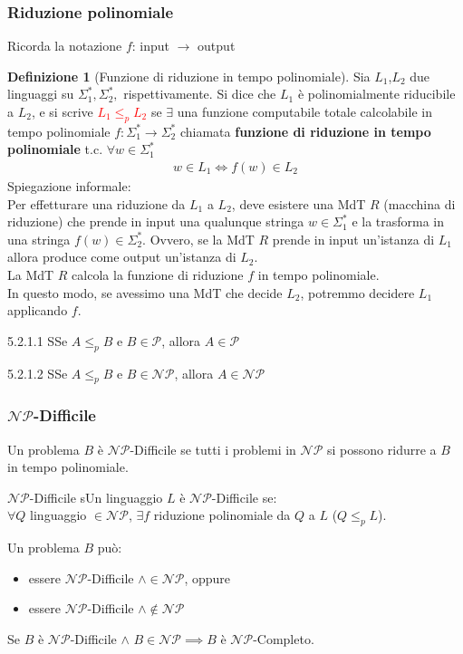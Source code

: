 \documentclass{article}  %
\theoremstyle{definition}
\newtheorem{definition}{Definizione}[section]
\begin{document}
\subsubsection{Riduzione polinomiale}
Ricorda la notazione $f$: input $\rightarrow$ output
\begin{definition}[Funzione di riduzione in tempo polinomiale]
	Sia $L_1$,$L_2$ due linguaggi su $\Sigma_{1}^*,\Sigma_{2}^*,$ rispettivamente.
	Si dice che $L_1$ è polinomialmente riducibile a $L_2$, e si scrive \textcolor{red}{$L_1 \leq_{p} L_2$} se $\exists$ una funzione computabile totale calcolabile in tempo polinomiale
	$f:\Sigma^*_1 \rightarrow \Sigma^*_2$ chiamata \textbf{funzione di riduzione in tempo polinomiale} t.c. $\forall{w}\in \Sigma^*_1$
	\begin{align*}
		w \in L_1 \iff f(w) \in L_2
	\end{align*}
	Spiegazione informale:\\
	Per effetturare una riduzione da $L_1$ a $L_2$, deve esistere una MdT $R$ (macchina di riduzione) che prende in input
	una qualunque stringa $w \in \Sigma^*_1$ e la trasforma in una stringa $f(w) \in \Sigma^*_2$.
	Ovvero, se la MdT $R$ prende in input un'istanza di $L_1$ allora produce come output un'istanza di $L_2$. \\
	La MdT $R$ calcola la funzione di riduzione $f$ in tempo polinomiale. \\
	In questo modo, se avessimo una MdT che decide $L_2$, potremmo decidere $L_1$ applicando $f$.
\end{definition}
\begin{theorem}{5.2.1.1}
	SSe $A \leq_p B$ e $B \in \mathcal{P}$, allora $A \in \mathcal{P}$
\end{theorem}
\begin{theorem}{5.2.1.2}
	SSe $A \leq_p B$ e $B \in \mathcal{NP}$, allora $A \in \mathcal{NP}$
\end{theorem}

\subsubsection{$\mathcal{NP}$-Difficile}
Un problema $B$ è $\mathcal{NP}$-Difficile se tutti i problemi in $\mathcal{NP}$ si possono ridurre a $B$ in tempo polinomiale.
\begin{theorem}{$\mathcal{NP}$-Difficile}
	sUn linguaggio $L$ è $\mathcal{NP}$-Difficile se: \\ $\forall{Q}$ linguaggio $\in \mathcal{NP}$, $\exists f$ riduzione
	polinomiale da $Q$ a $L$ ($Q \leq_p L$).
\end{theorem}
Un problema $B$ può:
\begin{itemize}
	\item essere $\mathcal{NP}$-Difficile $\land \in \mathcal{NP}$, oppure
	\item essere $\mathcal{NP}$-Difficile $\land \notin \mathcal{NP}$
\end{itemize}
Se $B$ è $\mathcal{NP}$-Difficile $\land$ $B \in \mathcal{NP} \implies B$ è $\mathcal{NP}$-Completo.
\end{document}
